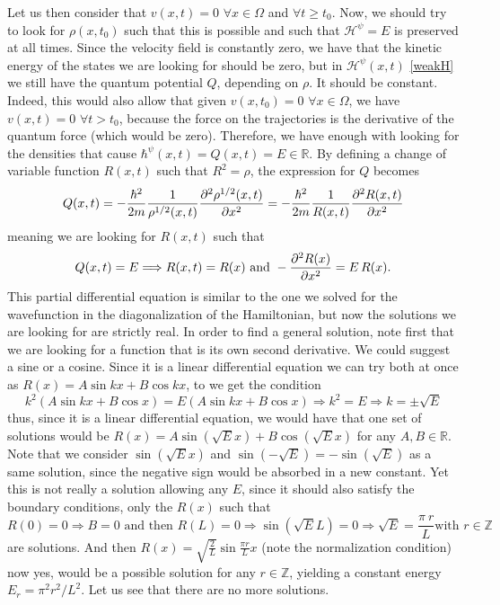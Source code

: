\documentclass[11pt, a4paper]{article} %
\newcommand{\R}{\mathbb{R}} %
\newcommand{\Z}{\mathbb{Z}} %
\newcommand{\h}{\mathcal{H}}
\DeclareRobustCommand{\mybox}[2][gray!10]{%
\begin{tcolorbox}[   %
        left=0.2cm,
        right=0.2cm,
        top=0.15cm,
        bottom=0.15cm,
        colback=#1,
        colframe=#1,
        width=\dimexpr\textwidth\relax, 
        enlarge left by=0mm,
        boxsep=5pt,
        arc=0pt,outer arc=0pt,
        ]
        #2
\end{tcolorbox}
}
\begin{document}
\mybox{
 Let us then consider that $v(x,t)=0$ $\forall x\in\Omega$ and $\forall t\geq t_0$. Now, we should try to look for $\rho(x,t_0)$ such that this is possible and such that $\h^\psi=E$ is preserved at all times. Since the velocity field is constantly zero, we have that the kinetic energy of the states we are looking for should be zero, but in $\h^\psi(x,t)$ \eqref{weakH} we still have the quantum potential $Q$, depending on $\rho$. It should be constant. Indeed, this would also allow that given $v(x,t_0)=0$ $\forall x\in\Omega$, we have $v(x,t)=0$ $\forall t>t_0$, because the force on the trajectories is the derivative of the quantum force (which would be zero). Therefore, we have enough with looking for the densities that cause $\hbar^\psi(x,t)=Q(x,t)=E\in\R$. By defining a change of variable function $R(x,t)$ such that $R^2=\rho$, the expression for $Q$ becomes
\begin{equation}
Q(x,t)= -\frac{\hbar^2}{2m}\frac{1}{\rho^{1/2}(x,t)}\pdv[2]{\rho^{1/2}(x,t)}{x}=-\frac{\hbar^2}{2m}\frac{1}{R(x,t)}\pdv[2]{R(x,t)}{x}
\end{equation}
meaning we are looking for $R(x,t)$ such that
\begin{equation}
Q(x,t)=E\Longrightarrow R(x,t)=R(x) \text{ and } -\pdv[2]{R(x)}{x}=E\,R(x).\label{esteeejk}
\end{equation}
This partial differential equation is similar to the one we solved for the wavefunction in the diagonalization of the Hamiltonian, but now the solutions we are looking for are strictly real. In order to find a general solution, note first that we are looking for a function that is its own second derivative. We could suggest a sine or a cosine. Since it is a linear differential equation we can try both at once as $R(x)=A \sin{kx}+B\cos{kx}$, to we get the condition
\begin{equation}
k^2(A\sin{kx}+B\cos{x})=E(A\sin{kx}+B\cos{x})\Rightarrow k^2=E\Rightarrow k=\pm\sqrt{E}
\end{equation}
thus, since it is a linear differential equation, we would have that one set of solutions would be $R(x)=A\sin{(\sqrt{E} x)}+B\cos{(\sqrt{E} x)}$ for any $A,B\in\R$. Note that we consider $\sin{(\sqrt{E}x)}$ and $\sin{(-\sqrt{E})}=-\sin{(\sqrt{E})}$ as a same solution, since the negative sign would be absorbed in a new constant. Yet this is not really a solution allowing any $E$, since it should also satisfy the boundary conditions, only the $R(x)$ such that
\begin{equation}
R(0)=0\Rightarrow B=0 \text{ and then } R(L)=0\Rightarrow \sin{(\sqrt{E}L)}=0\Rightarrow \sqrt{E}=\frac{\pi\ r}{L} \text{with }r\in\Z
\end{equation}
are solutions. And then $R(x)=\sqrt{\frac{2}{L}} \sin{\frac{\pi r}{L}x}$ (note the normalization condition) now yes, would be a possible solution for any $r\in\Z$, yielding a constant energy $E_r=\pi^2 r^2/L^2$. Let us see that there are no more solutions. 

}
\end{document}
